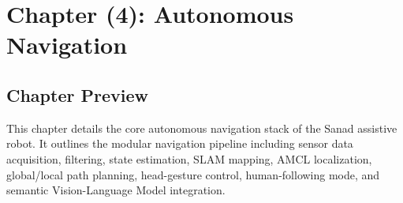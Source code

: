 \setcounter{chapter}{4} 
\chapter*{Chapter (4): Autonomous Navigation}
\setcounter{section}{0}

\section{Chapter Preview}
This chapter details the core autonomous navigation stack of the Sanad assistive robot. It outlines the modular navigation pipeline including sensor data acquisition, filtering, state estimation, SLAM mapping, AMCL localization, global/local path planning, head-gesture control, human-following mode, and semantic Vision-Language Model integration.

